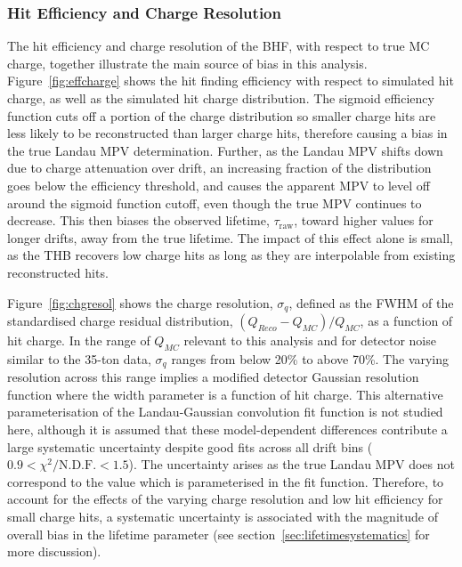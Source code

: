 \documentclass[10pt,a4paper]{article}
\begin{document}
\subsubsection{Hit Efficiency and Charge Resolution}\label{sec:chgresolution}

The hit efficiency and charge resolution of the BHF, with respect to true MC charge, together illustrate the main source of bias in this analysis. Figure~\ref{fig:effcharge} shows the hit finding efficiency with respect to simulated hit charge, as well as the simulated hit charge distribution. The sigmoid efficiency function cuts off a portion of the charge distribution so smaller charge hits are less likely to be reconstructed than larger charge hits, therefore causing a bias in the true Landau MPV determination. Further, as the Landau MPV shifts down due to charge attenuation over drift, an increasing fraction of the distribution goes below the efficiency threshold, and causes the apparent MPV to level off around the sigmoid function cutoff, even though the true MPV continues to decrease. This then biases the observed lifetime, $\tau_{\text{raw}}$, toward higher values for longer drifts, away from the true lifetime. The impact of this effect alone is small, as the THB recovers low charge hits as long as they are interpolable from existing reconstructed hits.

Figure~\ref{fig:chgresol} shows the charge resolution, $\sigma_q$, defined as the FWHM of the standardised charge residual distribution, $\left(Q_{Reco}-Q_{MC}\right)/Q_{MC}$, as a function of hit charge. In the range of $Q_{MC}$ relevant to this analysis and for detector noise similar to the 35-ton data, $\sigma_q$ ranges from below 20\% to above 70\%. The varying resolution across this range implies a modified detector Gaussian resolution function where the width parameter is a function of hit charge. This alternative parameterisation of the Landau-Gaussian convolution fit function is not studied here, although it is assumed that these model-dependent differences contribute a large systematic uncertainty despite good fits across all drift bins ($0.9<\chi^2/\text{N.D.F.}<1.5$). The uncertainty arises as the true Landau MPV does not correspond to the value which is parameterised in the fit function. Therefore, to account for the effects of the varying charge resolution and low hit efficiency for small charge hits, a systematic uncertainty is associated with the magnitude of overall bias in the lifetime parameter (see section~\ref{sec:lifetimesystematics} for more discussion).
\end{document}
